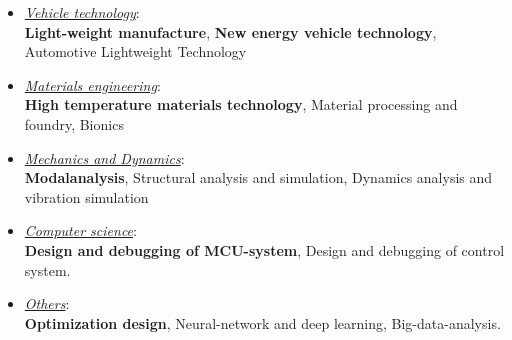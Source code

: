 \documentclass{resume}
\begin{document}
\bigskip

\begin{itemize}
	\setlength{\itemsep}{4pt}

	\item {\large \textit{\underline{Vehicle technology}}\hspace{1mm}:}\\[1.5mm]
	{\large \textbf{Light-weight manufacture}, \hspace{1mm} \textbf{New energy vehicle technology}, \hspace{1mm} Automotive
		Lightweight Technology}
	
	\item {\large \textit{\underline{Materials engineering}}\hspace{1mm}:}\\[1.5mm]
	{\large \textbf{High temperature materials technology}, \hspace{1mm} Material processing and foundry, \hspace{1mm} Bionics}
	
	\item {\large \textit{\underline{Mechanics and Dynamics}}\hspace{1mm}:} \\[1.5mm]
	{\large \textbf{Modalanalysis},\hspace{1mm} Structural analysis and simulation,\hspace{1mm} Dynamics analysis and vibration simulation}
	
	\item {\large \textit{\underline{Computer science}}\hspace{1mm}:} \\[1.5mm]
	{\large \textbf{Design and debugging of MCU-system}, Design and debugging of control system.}
	
	\item {\large \textit{\underline{Others}}\hspace{1mm}:} \\[1.5mm]
	{\large \textbf{Optimization design},\hspace{1mm} Neural-network and deep learning, \hspace{1mm} Big-data-analysis.}
	
\end{itemize}
\end{document}
